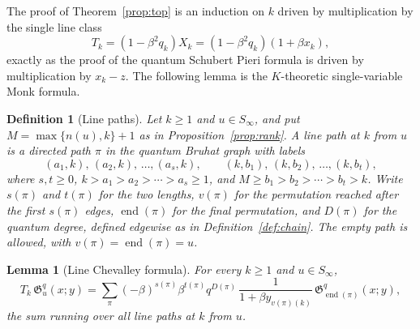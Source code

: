 \documentclass[11pt]{article}
\newtheorem{lemma}[proposition]{Lemma}
\newtheorem{definition}[proposition]{Definition}
\newcommand{\G}{\mathfrak{G}}
\begin{document}
The proof of Theorem~\ref{prop:top} is an induction on $k$ driven by
multiplication by the single line class
\[
 T_k=(1-\beta^2q_k)X_k=(1-\beta^2q_k)(1+\beta x_k),
\]
exactly as the proof of the quantum Schubert Pieri formula is driven
by multiplication by $x_k-z$. The following lemma is the
$K$-theoretic single-variable Monk formula.

\begin{definition}[Line paths]\label{def:line-path}
Let $k\geq1$ and $u\in S_\infty$, and put $M=\max\{n(u),k\}+1$ as in
Proposition~\ref{prop:rank}. A \emph{line path at $k$ from $u$} is a
directed path $\pi$ in the quantum Bruhat graph with labels
\[
 (a_1,k),\,(a_2,k),\,\ldots,(a_s,k),\qquad
 (k,b_1),\,(k,b_2),\,\ldots,(k,b_t),
\]
where $s,t\geq0$, $k>a_1>a_2>\cdots>a_s\geq1$, and
$M\geq b_1>b_2>\cdots>b_t>k$. Write $s(\pi)$ and $t(\pi)$ for the two
lengths, $v(\pi)$ for the permutation reached after the first
$s(\pi)$ edges, $\operatorname{end}(\pi)$ for the final permutation,
and $D(\pi)$ for the quantum degree, defined edgewise as in
Definition~\ref{def:chain}. The empty path is allowed, with
$v(\pi)=\operatorname{end}(\pi)=u$.
\end{definition}

\begin{lemma}[Line Chevalley formula]\label{lem:line-chevalley}
For every $k\geq1$ and $u\in S_\infty$,
\begin{equation}\label{eq:line-chevalley}
 T_k\,\G_u^q(x;y)
 =\sum_{\pi}
   (-\beta)^{s(\pi)}\beta^{t(\pi)}q^{D(\pi)}\,
   \frac{1}{1+\beta y_{v(\pi)(k)}}\,
   \G_{\operatorname{end}(\pi)}^q(x;y),
\end{equation}
the sum running over all line paths at $k$ from $u$.
\end{lemma}
\end{document}
